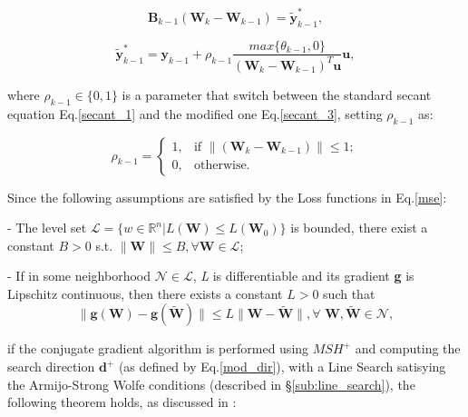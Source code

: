  			\begin{equation}
			\label{secant_3}
 				\textbf{B}_{k-1} (\textbf{W}_k - \textbf{W}_{k-1}) = \widetilde{\textbf{y}}_{k-1}^*,
 			\end{equation}

 			\begin{equation}
			\label{y_3}
 				\widetilde{\textbf{y}}_{k-1}^* = \textbf{y}_{k-1} + \rho_{k-1} \frac{max\{\theta_{k-1},0\}}{(\textbf{W}_k - \textbf{W}_{k-1})^T\textbf{u}}\textbf{u},
 			\end{equation}

 			where $\rho_{k-1} \in \{0,1\}$ is a parameter that switch between the standard secant equation Eq.\ref{secant_1} and the modified one Eq.\ref{secant_3}, setting $\rho_{k-1}$ as:

			\begin{equation}
			\label{rho}
			  \rho_{k-1} =\begin{cases}
			    1 , & \text{if }\|(\textbf{W}_k - \textbf{W}_{k-1})\| \leq 1;\\
			    0 , & \text{otherwise.}
			  \end{cases}
			\end{equation}

			Since the following assumptions are satisfied by the Loss functions in Eq.\ref{mse}:

			\begin{asu} - \label{as:1}
  				The level set $\mathcal{L} = \{w \in \mathbb{R}^n | \textit{L}(\textbf{W}) \leq L(\textbf{W}_0)\}$ is bounded, there exist a constant $B > 0$ s.t. $\|\textbf{W}\| \leq B, \forall \textbf{W} \in \mathcal{L}$;
			\end{asu}

			\begin{asu} - \label{as:2}
				If in some neighborhood $\mathcal{N} \in \mathcal{L}$, \textit{L} is differentiable and its gradient \textbf{g} is Lipschitz continuous, then there exists a constant $ L > 0 $ such that
				\begin{equation}
				\label{ass2}
				  \|\textbf{g}(\textbf{W})-\textbf{g}(\widetilde{\textbf{W}})\| \leq L\|\textbf{W}-\widetilde{\textbf{W}}\|, \forall \textbf{ W},\widetilde{\textbf{W}} \in \mathcal{N},
				\end{equation}
			\end{asu}
			if the conjugate gradient algorithm is performed using $MSH^+$ and computing the search direction $\textbf{d}^+$ (as defined by Eq.\ref{mod_dir}), with a Line Search satisying the Armijo-Strong Wolfe conditions (described in \S \ref{sub:line_search}), the following theorem holds, as discussed in \cite{LIVIERIS2013491}:

